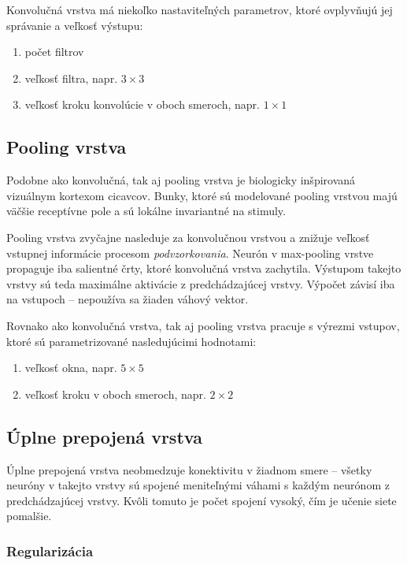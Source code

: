 Konvolučná vrstva má niekoľko nastaviteľných parametrov, ktoré ovplyvňujú jej správanie a veľkosť výstupu:
\begin{enumerate}
  \item počet filtrov
  \item veľkosť filtra, napr. $3 \times 3$
  \item veľkosť kroku konvolúcie v oboch smeroch, napr. $1 \times 1$
\end{enumerate}

\subsection{Pooling vrstva}

Podobne ako konvolučná, tak aj pooling vrstva je biologicky inšpirovaná vizuálnym kortexom cicavcov. Bunky, ktoré sú modelované pooling vrstvou majú väčšie receptívne pole a sú lokálne invariantné na stimuly.

Pooling vrstva zvyčajne nasleduje za konvolučnou vrstvou a znižuje veľkosť vstupnej informácie procesom \emph{podvzorkovania}. Neurón v max-pooling vrstve propaguje iba salientné črty, ktoré konvolučná vrstva zachytila. Výstupom takejto vrstvy sú teda maximálne aktivácie z predchádzajúcej vrstvy. Výpočet závisí iba na vstupoch -- nepoužíva sa žiaden váhový vektor.

Rovnako ako konvolučná vrstva, tak aj pooling vrstva pracuje s výrezmi vstupov, ktoré sú parametrizované nasledujúcimi hodnotami:
\begin{enumerate}
  \item veľkosť okna, napr. $5 \times 5$
  \item veľkosť kroku v oboch smeroch, napr. $2 \times 2$
\end{enumerate}

\subsection{Úplne prepojená vrstva}

Úplne prepojená vrstva neobmedzuje konektivitu v žiadnom smere -- všetky neuróny v takejto vrstvy sú spojené meniteľnými váhami s každým neurónom z predchádzajúcej vrstvy. Kvôli tomuto je počet spojení vysoký, čím je učenie siete pomalšie.

\subsubsection{Regularizácia}

